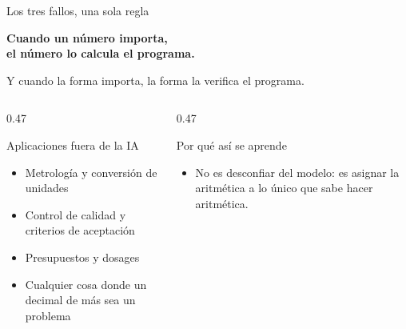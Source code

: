 \documentclass[aspectratio=169,11pt]{beamer}
\begin{document}
\begin{frame}{Los tres fallos, una sola regla}
  \begin{panelRegla}
    \centering\Large\bfseries
    Cuando un número importa,\\ el número lo calcula el programa.
    \par\vspace{8pt}
    \normalsize\normalfont
    Y cuando la forma importa, la forma la verifica el programa.
  \end{panelRegla}
  \vspace{8pt}
  \begin{columns}[T]
    \begin{column}{0.47\textwidth}
      \begin{block}{Aplicaciones fuera de la IA}
        \begin{itemize}
          \item Metrología y conversión de unidades
          \item Control de calidad y criterios de aceptación
          \item Presupuestos y dosages
          \item Cualquier cosa donde un decimal de más sea un problema
        \end{itemize}
      \end{block}
    \end{column}
    \begin{column}{0.47\textwidth}
      \begin{block}{Por qué así se aprende}
        \begin{itemize}
          \item No es desconfiar del modelo: es asignar la aritmética a lo único
                que sabe hacer aritmética.
        \end{itemize}
      \end{block}
    \end{column}
  \end{columns}
\end{frame}
\end{document}
